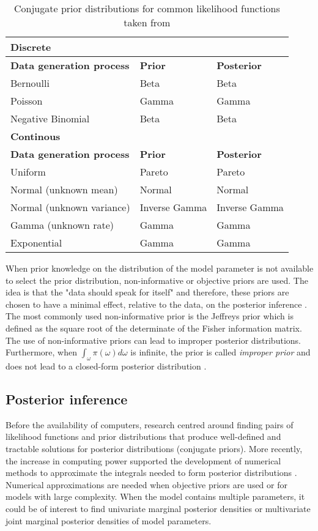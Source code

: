 \begin{table}[hb	]
\centering
\caption{Conjugate prior distributions for common likelihood functions taken from \citep{Fink1997}}
\label{tab0:priors}
\begin{tabular}{l l l}
\toprule
\textbf{Discrete} & &\\
\midrule
\midrule
\textbf{Data generation process} & \textbf{Prior} & \textbf{Posterior} \\ 
\midrule 
Bernoulli & Beta & Beta \\
Poisson & Gamma  & Gamma \\
Negative Binomial & Beta & Beta \\
\midrule
\midrule
\textbf{Continous} & & \\
\midrule
\midrule
\textbf{Data generation process} & \textbf{Prior} & \textbf{Posterior} \\ 
\midrule
Uniform  & Pareto & Pareto \\ 
Normal (unknown mean) &  Normal  & Normal \\ 
Normal (unknown variance) &  Inverse Gamma  & Inverse Gamma \\ 
Gamma (unknown rate) &  Gamma  & Gamma \\ 
Exponential &  Gamma  & Gamma \\ 
\bottomrule
\end{tabular}
\end{table} 

When prior knowledge on the distribution of the model parameter is not available to select the prior distribution, non-informative or objective priors are used. The idea is that the "data should speak for itself" and therefore, these priors are chosen to have a minimal effect, relative to the data, on the posterior inference \citep{Bernardo2000}. The most commonly used non-informative prior is the Jeffreys prior \citep{Jeffreys1946} which is defined as the square root of the determinate of the Fisher information matrix. The use of non-informative priors can lead to improper posterior distributions. Furthermore, when $\int_\omega\pi(\omega)d\omega$ is infinite, the prior is called \emph{improper prior} and does not lead to a closed-form posterior distribution \citep{Bernardo2003}.

\subsection{Posterior inference}

Before the availability of computers, research centred around finding pairs of likelihood functions and prior distributions that produce well-defined and tractable solutions for posterior distributions (conjugate priors). More recently, the increase in computing power supported the development of numerical methods to approximate the integrals needed to form posterior distributions \citep{Fink1997}. Numerical approximations are needed when objective priors are used or for models with large complexity. When the model contains multiple parameters, it could be of interest to find univariate marginal posterior densities or multivariate joint marginal posterior densities of model parameters.\\

